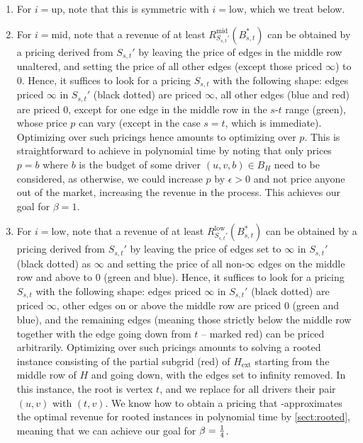 \begin{enumerate}[nosep]
    \item For $i = \mathrm{up}$, note that this is symmetric with $i = \mathrm{low}$, which we treat below.
    \item For $i = \mathrm{mid}$, note that a revenue of at least $R_{S_{s, t}'}^\mathrm{mid} (B_{s, t}^*)$ can be obtained by a pricing derived from $S_{s, t}'$ by leaving the price of edges in the middle row unaltered, and setting the price of all other edges (except those priced $\infty$) to 0. Hence, it suffices to look for a pricing $S_{s, t}$ with the following shape: edges priced $\infty$ in $S_{s, t}'$ (black dotted) are priced $\infty$, all other edges (blue and red) are priced 0, except for one edge in the middle row in the $s$-$t$ range (green), whose price $p$ can vary (except in the case $s = t$, which is immediate). Optimizing over such pricings hence amounts to optimizing over $p$. This is straightforward to achieve in polynomial time by noting that only prices $p = b$ where $b$ is the budget of some driver $(u, v, b) \in B_H$ need to be considered, as otherwise, we could increase $p$ by $\epsilon > 0$ and not price anyone out of the market, increasing the revenue in the process. This achieves our goal for $\beta = 1$.
    \item For $i = \mathrm{low}$, note that a revenue of at least $R_{S_{s, t}'}^\mathrm{low} (B_{s, t}^*)$ can be obtained by a pricing derived from $S_{s, t}'$ by leaving the price of edges set to $\infty$ in $S_{s, t}'$ (black dotted) as $\infty$ and setting the price of all non-$\infty$ edges on the middle row and above to 0 (green and blue). Hence, it suffices to look for a pricing $S_{s, t}$ with the following shape: edges priced $\infty$ in $S_{s, t}'$ (black dotted) are priced $\infty$, other edges on or above the middle row are priced $0$ (green and blue), and the remaining edges (meaning those strictly below the middle row together with the edge going down from $t$ -- marked red) can be priced arbitrarily. Optimizing over such pricings amounts to solving a rooted instance consisting of the partial subgrid (red) of $H_\mathrm{ext}$ starting from the middle row of $H$ and going down, with the edges set to infinity removed. In this instance, the root is vertex $t$, and we replace for all drivers their pair $(u, v)$ with $(t, v)$. We know how to obtain a pricing that \Crounding-approximates the optimal revenue for rooted instances in polynomial time by \cref{sect:rooted}, meaning that we can achieve our goal for $\beta = \frac{1}{4}$.
\end{enumerate}

